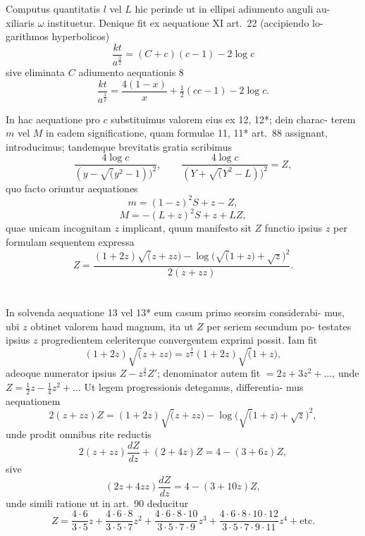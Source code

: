 \documentclass[12pt,a4paper]{article}
\begin{document}
Computus quantitatis $l$ vel $L$ hic perinde ut in ellipsi adiumento anguli au-
xiliaris $\omega$ instituetur. Denique fit ex aequatione XI art.~22 (accipiendo lo-
garithmos hyperbolicos)
\[
\frac{kt}{a^{\frac{3}{2}}} = (C + c)(c - 1) - 2\log c
\]
sive eliminata $C$ adiumento aequationis 8
\[
\frac{kt}{a^{\frac{3}{2}}} = \frac{4(1 - x)}{x} + \tfrac{1}{2}(cc - 1) - 2\log c.
\]

In hac aequatione pro $c$ substituimus valorem eius ex 12, 12*; dein charac-
terem $m$ vel $M$ in eadem significatione, quam formulae 11, 11* art.~88 assignant,
introducimus; tandemque brevitatis gratia scribimus
\[
\frac{4\log c}{(y - \surd(y^2 - 1))^2}, \qquad \frac{4\log c}{(Y + \surd(Y^2 - L))^2} = Z,
\]
quo facto oriuntur aequationes
\begin{equation}\tag{13}
m = (1 - z)^2S + z - Z,
\end{equation}
\begin{equation}\tag{13*}
M = -(L + z)^2S + z + LZ,
\end{equation}
quae unicam incognitam $z$ implicant, quum manifesto sit $Z$ functio ipsius $z$
per formulam sequentem expressa
\[
Z = \frac{(1 + 2z)\surd(z + zz) - \log\bigl(\surd(1 + z) + \surd z\bigr)^2}{2(z + zz)}.
\]

\section{}

In solvenda aequatione 13 vel 13* eum casum primo seorsim considerabi-
mus, ubi $z$ obtinet valorem haud magnum, ita ut $Z$ per seriem secundum po-
testates ipsius $z$ progredientem celeriterque convergentem exprimi possit. Iam fit
\[
(1 + 2z)\surd(z + zz) = z^{\frac{3}{2}}(1 + 2z)\surd(1 + z),
\]
adeoque numerator ipsius $Z - z^{\frac{3}{2}}Z'$; denominator autem fit $= 2z + 3z^2
+ \dots$, unde $Z = \tfrac{1}{2}z - \tfrac{1}{4}z^2 + \dots$ Ut legem progressionis detegamus, differentia-
mus aequationem
\[
2(z + zz)Z = (1 + 2z)\surd(z + zz) - \log\bigl(\surd(1 + z) + \surd z\bigr)^2,
\]
unde prodit omnibus rite reductis
\[
2(z + zz)\frac{dZ}{dz} + (2 + 4z)Z = 4 - (3 + 6z)Z,
\]
sive
\[
(2z + 4zz)\frac{dZ}{dz} = 4 - (3 + 10z)Z,
\]
unde simili ratione ut in art.~90 deducitur
\[
Z = \frac{4\cdot 6}{3\cdot 5}z + \frac{4\cdot 6\cdot 8}{3\cdot 5\cdot 7}z^2 + \frac{4\cdot 6\cdot 8\cdot 10}{3\cdot 5\cdot 7\cdot 9}z^3 + \frac{4\cdot 6\cdot 8\cdot 10\cdot 12}{3\cdot 5\cdot 7\cdot 9\cdot 11}z^4 + \text{etc.}
\]
\end{document}
